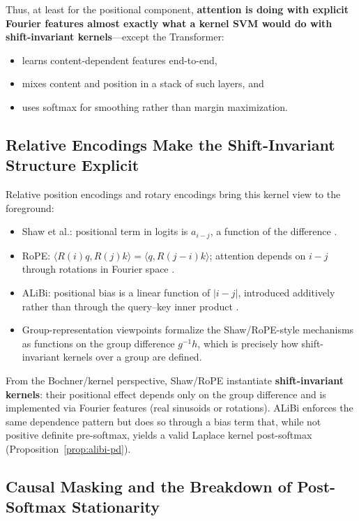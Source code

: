 \documentclass[11pt]{article}
\theoremstyle{definition}
\begin{document}
Thus, at least for the positional component, \textbf{attention is doing with explicit Fourier features almost exactly what a kernel SVM would do with shift-invariant kernels}---except the Transformer:

\begin{itemize}
    \item learns content-dependent features end-to-end,
    \item mixes content and position in a stack of such layers, and
    \item uses softmax for smoothing rather than margin maximization.
\end{itemize}

\subsection{Relative Encodings Make the Shift-Invariant Structure Explicit}

Relative position encodings and rotary encodings bring this kernel view to the foreground:

\begin{itemize}
    \item Shaw et al.: positional term in logits is \(a_{i-j}\), a function of the difference \cite{shaw2018self}.
    \item RoPE: \(\langle R(i) q, R(j) k \rangle = \langle q, R(j-i) k \rangle\); attention depends on \(i-j\) through rotations in Fourier space \cite{su2021roformer}.
    \item ALiBi: positional bias is a linear function of \(|i-j|\), introduced additively rather than through the query--key inner product \cite{press2022train}.
    \item Group-representation viewpoints \cite{lim2024positional,kogkalidis2023algebraic} formalize the Shaw/RoPE-style mechanisms as functions on the group difference \(g^{-1} h\), which is precisely how shift-invariant kernels over a group are defined.
\end{itemize}

From the Bochner/kernel perspective, Shaw/RoPE instantiate \textbf{shift-invariant kernels}: their positional effect depends only on the group difference and is implemented via Fourier features (real sinusoids or rotations). ALiBi enforces the same dependence pattern but does so through a bias term that, while not positive definite pre-softmax, yields a valid Laplace kernel post-softmax (Proposition~\ref{prop:alibi-pd}).

\subsection{Causal Masking and the Breakdown of Post-Softmax Stationarity}
\label{sec:causal-masking-framework}
\end{document}
